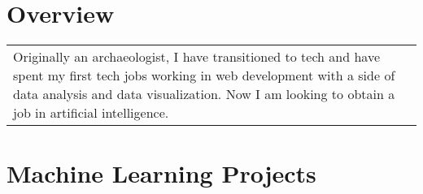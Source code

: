 \documentclass[letterpaper]{resume}
\begin{document}
\author{Sarah F. Majors}
\maketitle

\section{Overview}
\goodbreak\vspace{\secskip}\par\noindent\begin{tabularx}{\linewidth}{Xr}  
  Originally an archaeologist, I have transitioned to tech and have spent my first tech jobs working in web development with a side of data analysis and data visualization.  Now I am looking to obtain a job in artificial intelligence.
\end{tabularx}


\section{Machine Learning Projects}
\end{document}

